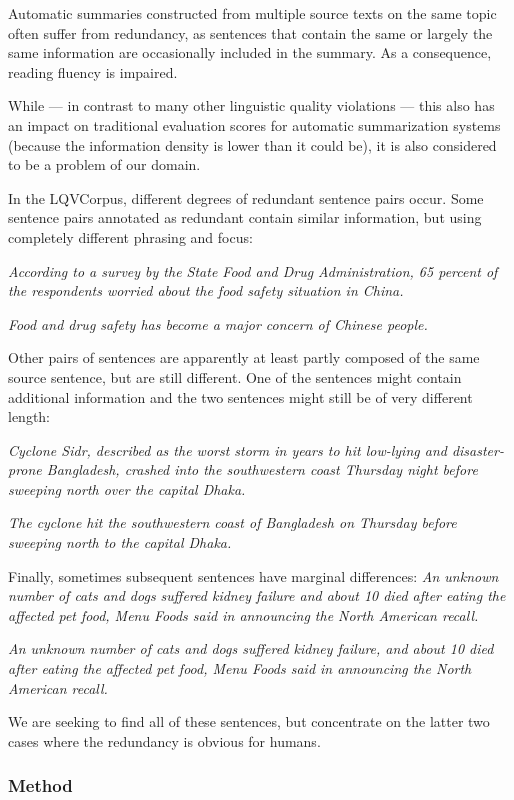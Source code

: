 \documentclass[a4paper,10pt]{scrartcl}
\theoremstyle{style}
\begin{document}
Automatic summaries constructed from multiple source texts on the same topic often suffer from redundancy, as sentences that contain the same or largely the same information are occasionally included in the summary. As a consequence, reading fluency is impaired.

While --- in contrast to many other linguistic quality violations --- this also has an impact on traditional evaluation scores for automatic summarization systems (because the information density is lower than it could be), it is also considered to be a problem of our domain.

In the LQVCorpus, different degrees of redundant sentence pairs occur. Some sentence pairs annotated as redundant contain similar information, but using completely different phrasing and focus:

\textit{According to a survey by the State Food and Drug Administration, 65 percent of the respondents worried about the food safety situation in China.}

\textit{Food and drug safety has become a major concern of Chinese people.}

Other pairs of sentences are apparently at least partly composed of the same source sentence, but are still different. One of the sentences might contain additional information and the two sentences might still be of very different length:

\textit{Cyclone Sidr, described as the worst storm in years to hit low-lying and disaster-prone Bangladesh, crashed into the southwestern coast Thursday night before sweeping north over the capital Dhaka.}

\textit{The cyclone hit the southwestern coast of Bangladesh on Thursday before sweeping north to the capital Dhaka.}

Finally, sometimes subsequent sentences have marginal differences:
\textit{An unknown number of cats and dogs suffered kidney failure and about 10 died after eating the affected pet food, Menu Foods said in announcing the North American recall.}

\textit{An unknown number of cats and dogs suffered kidney failure, and about 10 died after eating the affected pet food, Menu Foods said in announcing the North American recall.}

We are seeking to find all of these sentences, but concentrate on the latter two cases where the redundancy is obvious for humans.

\subsubsection{Method}
\end{document}
